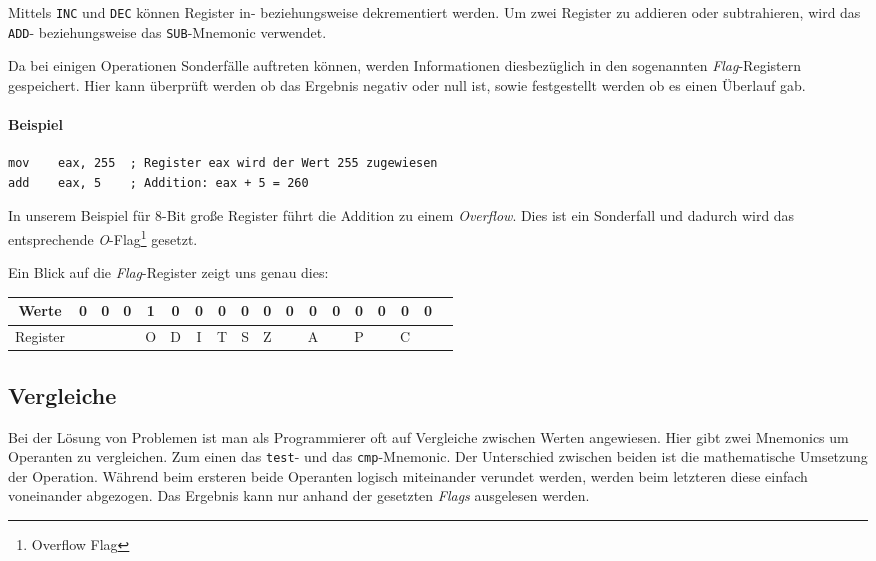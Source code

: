 Mittels \texttt{INC} und \texttt{DEC} können Register in- beziehungsweise dekrementiert werden. Um zwei Register zu addieren oder subtrahieren, wird das \texttt{ADD}- beziehungsweise das \texttt{SUB}-Mnemonic verwendet.

Da bei einigen Operationen Sonderfälle auftreten können, werden Informationen diesbezüglich in den sogenannten \textit{Flag}-Registern gespeichert.
Hier kann überprüft werden ob das Ergebnis negativ oder null ist, sowie festgestellt werden ob es einen Überlauf gab.

\paragraph{Beispiel\newline}\makebox{}

\begin{lstlisting}
mov    eax, 255  ; Register eax wird der Wert 255 zugewiesen
add    eax, 5    ; Addition: eax + 5 = 260 
\end{lstlisting}

In unserem Beispiel für 8-Bit große Register führt die Addition zu einem \textit{Overflow}.
Dies ist ein Sonderfall und dadurch wird das entsprechende \textit{O}-Flag\footnote{Overflow Flag} gesetzt.

Ein Blick auf die \textit{Flag}-Register zeigt uns genau dies:

\begin{tabular}{|c|c|c|c|c|c|c|c|c|c|c|c|c|c|c|c|c|c|}
\hline Werte & 0 & 0 & 0 & 1 & 0 & 0 & 0 & 0 & 0 & 0 & 0 & 0 & 0 & 0 & 0 & 0 \\
\hline Register & & & & O & D & I & T & S & Z & & A & & P & & C & \\
\hline
\end{tabular}

\subsection{Vergleiche}
Bei der Lösung von Problemen ist man als Programmierer oft auf Vergleiche zwischen Werten angewiesen.
Hier gibt zwei Mnemonics um Operanten zu vergleichen. Zum einen das \texttt{test}- und das \texttt{cmp}-Mnemonic.
Der Unterschied zwischen beiden ist die mathematische Umsetzung der Operation. Während beim ersteren beide Operanten logisch miteinander verundet werden, werden beim letzteren diese einfach voneinander abgezogen. 
Das Ergebnis kann nur anhand der gesetzten \textit{Flags} ausgelesen werden.

